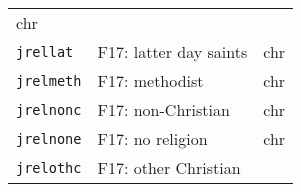 \documentclass[]{article}
\begin{document}
\begin{longtable}[]{@{}lll@{}}
\begin{minipage}[t]{0.08\columnwidth}
chr\strut
\end{minipage}\tabularnewline
\begin{minipage}[t]{0.14\columnwidth}\raggedright\strut
\texttt{jrellat}\strut
\end{minipage} & \begin{minipage}[t]{0.70\columnwidth}\raggedright\strut
F17: latter day saints\strut
\end{minipage} & \begin{minipage}[t]{0.08\columnwidth}\raggedright\strut
chr\strut
\end{minipage}\tabularnewline
\begin{minipage}[t]{0.14\columnwidth}\raggedright\strut
\texttt{jrelmeth}\strut
\end{minipage} & \begin{minipage}[t]{0.70\columnwidth}\raggedright\strut
F17: methodist\strut
\end{minipage} & \begin{minipage}[t]{0.08\columnwidth}\raggedright\strut
chr\strut
\end{minipage}\tabularnewline
\begin{minipage}[t]{0.14\columnwidth}\raggedright\strut
\texttt{jrelnonc}\strut
\end{minipage} & \begin{minipage}[t]{0.70\columnwidth}\raggedright\strut
F17: non-Christian\strut
\end{minipage} & \begin{minipage}[t]{0.08\columnwidth}\raggedright\strut
chr\strut
\end{minipage}\tabularnewline
\begin{minipage}[t]{0.14\columnwidth}\raggedright\strut
\texttt{jrelnone}\strut
\end{minipage} & \begin{minipage}[t]{0.70\columnwidth}\raggedright\strut
F17: no religion\strut
\end{minipage} & \begin{minipage}[t]{0.08\columnwidth}\raggedright\strut
chr\strut
\end{minipage}\tabularnewline
\begin{minipage}[t]{0.14\columnwidth}\raggedright\strut
\texttt{jrelothc}\strut
\end{minipage} & \begin{minipage}[t]{0.70\columnwidth}\raggedright\strut
F17: other Christian\strut
\end{minipage} & \begin{minipage}[t]{0.08\columnwidth}\raggedright\strut

\end{minipage}
\end{longtable}
\end{document}
